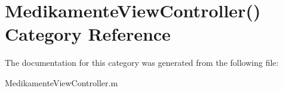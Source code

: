 \hypertarget{category_medikamente_view_controller_07_08}{}\section{Medikamente\+View\+Controller() Category Reference}
\label{category_medikamente_view_controller_07_08}


The documentation for this category was generated from the following file\+:\begin{DoxyCompactItemize}
\item 
Medikamente\+View\+Controller.\+m\end{DoxyCompactItemize}
